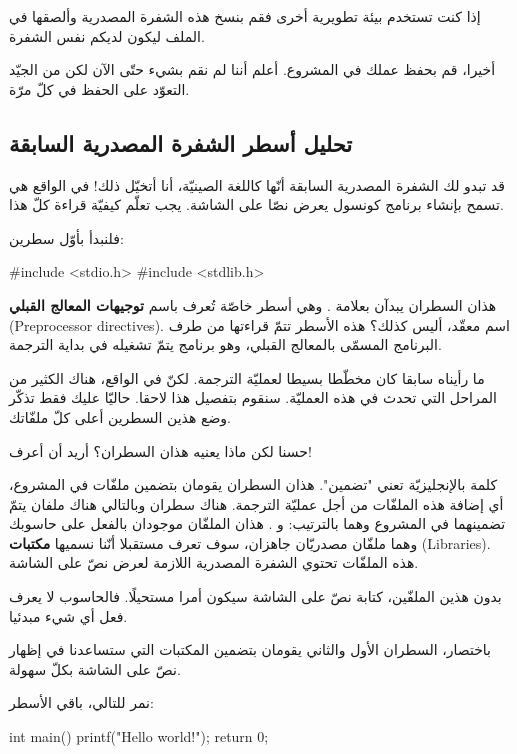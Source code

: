 إذا كنت تستخدم بيئة تطويرية أخرى فقم بنسخ هذه الشفرة المصدرية وألصقها في الملف  ليكون لديكم نفس الشفرة.

أخيرا، قم بحفظ عملك في المشروع. أعلم أننا لم نقم بشيء حتّى الآن لكن من الجيّد التعوّد على الحفظ في كلّ مرّة.

\subsection{تحليل أسطر الشفرة المصدرية السابقة}
قد تبدو لك الشفرة المصدرية السابقة أنّها كاللغة الصينيّة، أنا أتخيّل ذلك! في الواقع هي تسمح بإنشاء برنامج كونسول يعرض نصّا على الشاشة. يجب تعلّم كيفيّة قراءة كلّ هذا.

فلنبدأ بأوّل سطرين:
\begin{Csource}
#include <stdio.h>
#include <stdlib.h>
\end{Csource}

هذان السطران يبدآن بعلامة
\InlineCode{\#}.
وهي أسطر خاصّة تُعرف باسم
\textbf{توجيهات المعالج القبلي}
(\textenglish{Preprocessor directives}). اسم معقّد، أليس كذلك؟ هذه الأسطر تتمّ قراءتها من طرف البرنامج المسمّى بالمعالج القبلي، وهو برنامج يتمّ تشغيله في بداية الترجمة.

ما رأيناه سابقا كان مخطّطا بسيطا لعمليّة الترجمة. لكنّ في الواقع، هناك الكثير من المراحل التي تحدث في هذه العمليّة. سنقوم بتفصيل هذا لاحقا. حاليّا عليك فقط تذكّر وضع هذين السطرين أعلى كلّ ملفّاتك.

\begin{question}
  حسنا لكن ماذا يعنيه هذان السطران؟ أريد أن أعرف!
\end{question}

كلمة
 بالإنجليزيّة تعني "تضمين". هذان السطران يقومان بتضمين ملفّات في المشروع، أي إضافة هذه الملفّات من أجل عمليّة الترجمة. هناك سطران وبالتالي هناك ملفان يتمّ تضمينهما في المشروع وهما بالترتيب:
 و
.
هذان الملفّان موجودان بالفعل على حاسوبك وهما ملفّان مصدريّان جاهزان، سوف تعرف مستقبلا أنّنا نسميها
\textbf{مكتبات}
(\textenglish{Libraries}).
 هذه الملفّات تحتوي الشفرة المصدرية اللازمة لعرض نصّ على الشاشة.

 بدون هذين الملفّين، كتابة نصّ على الشاشة سيكون أمرا مستحيلًا. فالحاسوب لا يعرف فعل أي شيء مبدئيا.

 باختصار، السطران الأول والثاني يقومان بتضمين المكتبات التي ستساعدنا في إظهار نصّ على الشاشة بكلّ سهولة.

 نمر للتالي، باقي الأسطر:
 
\begin{Csource}
int main()
{
    printf("Hello world!\n");
    return 0;
}
\end{Csource}

